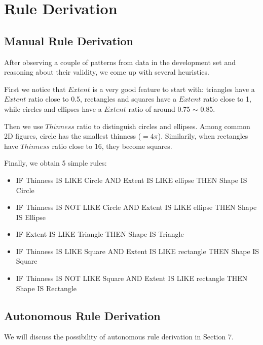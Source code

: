 \section{Rule Derivation}

\subsection{Manual Rule Derivation}

After observing a couple of patterns from data in the development set and reasoning about their validity, we come up with several heuristics.

First we notice that $Extent$ is a very good feature to start with: triangles have a $Extent$ ratio close to 0.5, rectangles and squares have a $Extent$ ratio close to 1, while circles and ellipses have a $Extent$ ratio of around 0.75 $\sim$ 0.85.

Then we use $Thinness$ ratio to distinguish circles and ellipses. Among common 2D figures, circle has the smallest thinness ($=4\pi$). Similarily, when rectangles have $Thinness$ ratio close to 16, they become squares.

Finally, we obtain 5 simple rules:

\begin{itemize}

\item IF Thinness IS LIKE Circle AND Extent IS LIKE ellipse THEN Shape IS Circle
\item IF Thinness IS NOT LIKE Circle AND Extent IS LIKE ellipse THEN Shape IS Ellipse
\item IF Extent IS LIKE Triangle THEN Shape IS Triangle
\item IF Thinness IS LIKE Square AND Extent IS LIKE rectangle THEN Shape IS Square
\item IF Thinness IS NOT LIKE Square AND Extent IS LIKE rectangle THEN Shape IS Rectangle

\end{itemize}

\subsection{Autonomous Rule Derivation}

We will discuss the possibility of autonomous rule derivation in Section 7.